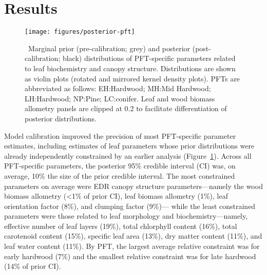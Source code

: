 \section{Results}

\begin{figure}
  \centering
  \texttt{[image: figures/posterior-pft]}
  \caption{\label{fig:posterior-pft}\
    Marginal prior (pre-calibration; grey) and posterior (post-calibration; black) distributions of PFT-specific parameters
    related to leaf biochemistry and canopy structure.
    Distributions are shown as violin plots (rotated and mirrored kernel density plots).
    PFTs are abbreviated as follows:
    EH:\@Early Hardwood;
    MH:\@North Mid Hardwood;
    LH:\@Late Hardwood;
    NP:\@Northern Pine;
    LC:\@Late conifer.
    Leaf and wood biomass allometry panels are clipped at 0.2 to facilitate differentiation of posterior distributions.
  }
\end{figure}

Model calibration improved the precision of most PFT-specific parameter estimates, including estimates of leaf parameters whose prior distributions were already independently constrained by an earlier analysis (Figure~\ref{fig:posterior-pft}).
Across all PFT-specific parameters, the posterior 95\% credible interval (CI) was, on average, 10\% the size of the prior credible interval.
The most constrained parameters on average were EDR canopy structure parameters---namely the wood biomass allometry (<1\% of prior CI), leaf biomass allometry (1\%), leaf orientation factor (8\%), and clumping factor (9\%)---
while the least constrained parameters were those related to leaf morphology and biochemistry---namely, effective number of leaf layers (19\%), total chlorphyll content (16\%), total carotenoid content (15\%), specific leaf area (13\%), dry matter content (11\%), and leaf water content (11\%).
By PFT, the largest average relative constraint was for early hardwood (7\%) and the smallest relative constraint was for late hardwood (14\% of prior CI).

